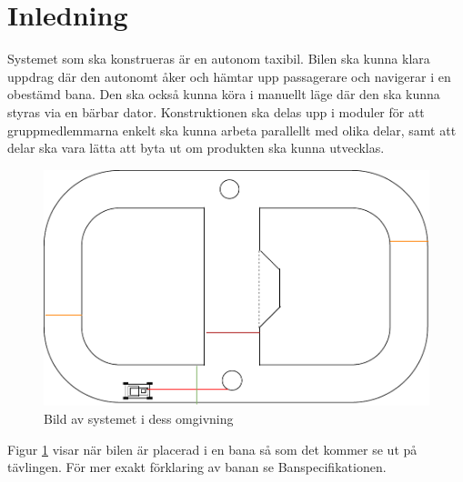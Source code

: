 \documentclass[systemskiss/skiss.tex]{subfiles}
\begin{document}
\section{Inledning}
Systemet som ska konstrueras är en autonom taxibil. Bilen ska kunna klara uppdrag där den autonomt åker och hämtar upp passagerare och navigerar i en obestämd bana. Den ska också kunna köra i manuellt läge där den ska kunna styras via en bärbar dator. Konstruktionen ska delas upp i moduler för att gruppmedlemmarna enkelt ska kunna arbeta parallellt med olika delar, samt att delar ska vara lätta att byta ut om produkten ska kunna utvecklas.

\begin{figure}[h]
    \centering
    \includegraphics[width=0.6\linewidth]{systemskiss/figures/systemomgivning.pdf}
    \caption{Bild av systemet i dess omgivning}
    \label{fig:omgivning}
\end{figure}

Figur \ref{fig:omgivning} visar när bilen är placerad i en bana så som det kommer se ut på tävlingen. För mer exakt förklaring av banan se Banspecifikationen.
\end{document}
